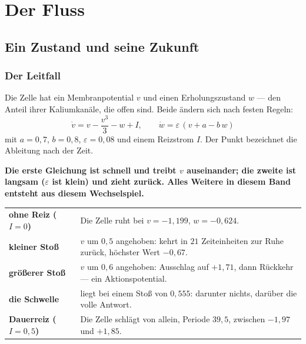 \part{Der Fluss}

\chapter{Ein Zustand und seine Zukunft}

\section{Der Leitfall}

\begin{merksatz}
Die Zelle hat ein Membranpotential $v$ und einen Erholungszustand $w$ --- den Anteil ihrer Kaliumkanäle, die offen sind. Beide ändern sich nach festen Regeln:
\[ \dot v = v - \frac{v^{3}}{3} - w + I, \qquad \dot w = \varepsilon\,(v + a - b\,w) \]
mit $a = 0{,}7$, $b = 0{,}8$, $\varepsilon = 0{,}08$ und einem Reizstrom $I$. Der Punkt bezeichnet die Ableitung nach der Zeit.

\begin{center}
\begin{minipage}{0.9\textwidth}
\textbf{Die erste Gleichung ist schnell und treibt $v$ auseinander; die zweite ist langsam ($\varepsilon$ ist klein) und zieht zurück. Alles Weitere in diesem Band entsteht aus diesem Wechselspiel.}
\end{minipage}
\end{center}

\begin{center}
{\small
\renewcommand{\arraystretch}{1.48}
\begin{tabular}{@{}P{3.2cm}P{5.4cm}@{}}
\toprule
\textbf{ohne Reiz ($I=0$)} & Die Zelle ruht bei $v = -1{,}199$, $w = -0{,}624$.\\
\textbf{kleiner Stoß} & $v$ um $0{,}5$ angehoben: kehrt in $21$ Zeiteinheiten zur Ruhe zurück, höchster Wert $-0{,}67$.\\
\textbf{größerer Stoß} & $v$ um $0{,}6$ angehoben: Ausschlag auf $+1{,}71$, dann Rückkehr --- ein Aktionspotential.\\
\textbf{die Schwelle} & liegt bei einem Stoß von $0{,}555$: darunter nichts, darüber die volle Antwort.\\
\textbf{Dauerreiz ($I = 0{,}5$)} & Die Zelle schlägt von allein, Periode $39{,}5$, zwischen $-1{,}97$ und $+1{,}85$.\\
\bottomrule
\end{tabular}}
\end{center}


\end{merksatz}
